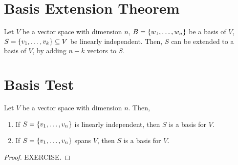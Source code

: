 \documentclass[letterpaper,12pt]{article}
\begin{document}
\section*{Basis Extension Theorem}
\begin{theorem}
Let $V$ be a vector space with dimension $n$, $B = \left\{ w_1, \dots, w_n \right\}$ be a basis of $V$, $S = \left\{ v_1, \dots, v_k \right\} \subseteq V$ be linearly independent. Then, $S$ can be extended to a basis of $V$, by adding $n-k$ vectors to $S$.
\end{theorem}

\section*{Basis Test}
\begin{theorem}
Let $V$ be a vector space with dimension $n$. Then,
\begin{enumerate}
    \item If $S = \left\{ v_1, \dots, v_n \right\}$ is linearly independent, then $S$ is a basis for $V$.
    \item If $S = \left\{ v_1, \dots, v_n \right\}$ spans $V$, then $S$ is a basis for $V$.
\end{enumerate}
\begin{proof}
EXERCISE.
\end{proof}

\end{theorem}
\end{document}
